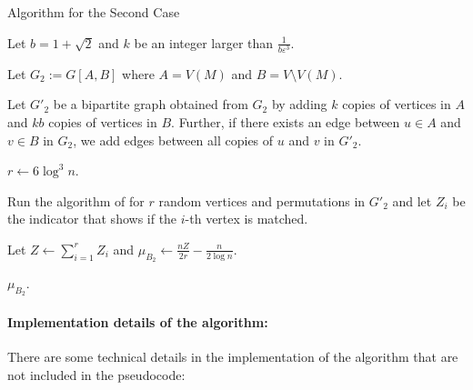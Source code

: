 \documentclass[letterpaper,11pt]{article}
\renewcommand{\epsilon}{\varepsilon}
\begin{document}
\begin{algorithm}[H]
\caption{Algorithm for the Second Case}
\label{alg:second-case}
Let $b = 1 + \sqrt{2}$ and $k$ be an integer larger than $\frac{1}{b\epsilon^3}$.

Let $G_2 := G[A,B]$ where $A = V(M)$ and $B = V \setminus V(M)$.

Let $G'_2$ be a bipartite graph obtained from $G_2$ by adding $k$ copies of vertices in $A$ and $kb$ copies of vertices in $B$. Further, if there exists an edge between $u \in A$ and $v \in B$ in $G_2$, we add edges between all copies of $u$ and $v$ in $G'_2$.


$r \gets 6 \log^3 n$.


Run the algorithm of  for $r$ random vertices and permutations in $G'_2$ and let $Z_i$ be the indicator that shows if the $i$-th vertex is matched.


Let $Z \gets \sum_{i=1}^r Z_i$ and $\mu_{B_2} \gets \frac{nZ}{2r} - \frac{n}{2\log n}$.

\Return $\mu_{B_2}$.
    
\end{algorithm}


\paragraph{Implementation details of the algorithm:} There are some technical details in the implementation of the algorithm that are not included in the pseudocode:
\end{document}
